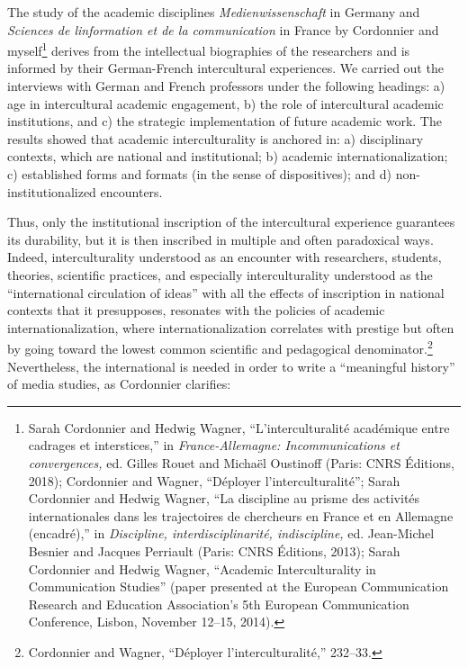 \documentclass{tufte-handout}
\begin{document}
The study of the academic disciplines \emph{Medienwissenschaft} in
Germany and \emph{Sciences de l\textquotesingle information et de la
communication} in France by Cordonnier and myself\footnote{Sarah
  Cordonnier and Hedwig Wagner, ``L'interculturalité académique entre
  cadrages et interstices,'' in \emph{France-Allemagne: Incommunications
  et convergences,} ed. Gilles Rouet and Michaël Oustinoff (Paris: CNRS
  Éditions, 2018); Cordonnier and Wagner, ``Déployer
  l'interculturalité''; Sarah Cordonnier and Hedwig Wagner, ``La
  discipline au prisme des activités internationales dans les
  trajectoires de chercheurs en France et en Allemagne (encadré),'' in
  \emph{Discipline, interdisciplinarité, indiscipline,} ed. Jean-Michel
  Besnier and Jacques Perriault (Paris: CNRS Éditions, 2013); Sarah
  Cordonnier and Hedwig Wagner, ``Academic Interculturality in
  Communication Studies'' (paper presented at the European Communication
  Research and Education Association's 5th European Communication
  Conference, Lisbon, November 12--15, 2014).} derives from the
intellectual biographies of the researchers and is informed by their
German-French intercultural experiences. We carried out the interviews
with German and French professors under the following headings: a) age
in intercultural academic engagement, b) the role of intercultural
academic institutions, and c) the strategic implementation of future
academic work. The results showed that academic interculturality is
anchored in: a) disciplinary contexts, which are national and
institutional; b) academic internationalization; c) established forms
and formats (in the sense of dispositives); and d) non-institutionalized
encounters.

Thus, only the institutional inscription of the intercultural experience
guarantees its durability, but it is then inscribed in multiple and
often paradoxical ways. Indeed, interculturality understood as an
encounter with researchers, students, theories, scientific practices,
and especially interculturality understood as the ``international
circulation of ideas'' with all the effects of inscription in national
contexts that it presupposes, resonates with the policies of academic
internationalization, where internationalization correlates with
prestige but often by going toward the lowest common scientific and
pedagogical denominator.\footnote{Cordonnier and Wagner, ``Déployer
  l'interculturalité,'' 232--33.} Nevertheless, the international is
needed in order to write a ``meaningful history'' of media studies, as
Cordonnier clarifies:
\end{document}
